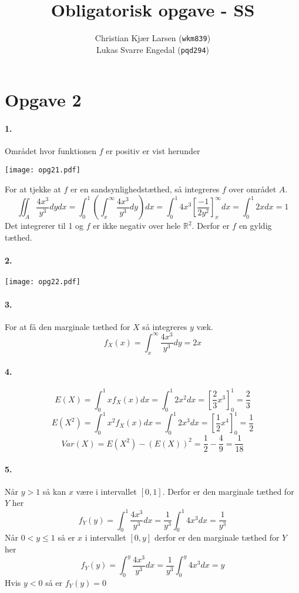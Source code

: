 \documentclass[12pt]{article}
\title{Obligatorisk opgave - SS}
\author{Christian Kjær Larsen (\texttt{wkm839})\\ Lukas Svarre Engedal (\texttt{pqd294})}
\begin{document}
\maketitle

\section*{Opgave 2}

\paragraph{1.}
Området hvor funktionen $f$ er positiv er vist herunder
\begin{center}
  \texttt{[image: opg21.pdf]}
\end{center}
For at tjekke at $f$ er en sandsynlighedstæthed, så integreres $f$ over området $A$.
\[
    \iint_A \frac{4x^3}{y^3} dydx = \int_0^1 \left( \int_x^\infty \frac{4x^3}{y^3} dy \right) dx
    = \int_0^1 4x^3 \left[ \frac{-1}{2y^2} \right]_x^\infty dx
    = \int_0^1 2x dx = 1
\]
Det integrerer til 1 og $f$ er ikke negativ over hele $\mathbb{R}^2$. Derfor er $f$ en gyldig tæthed.
\paragraph{2.}
\begin{center}
  \texttt{[image: opg22.pdf]}
\end{center}
\paragraph{3.}
For at få den marginale tæthed for $X$ så integreres $y$ væk.
\[
    f_X(x)=\int_x^\infty \frac{4x^3}{y^3} dy = 2x
\]
\paragraph{4.}
\[
    E(X) = \int_0^1 xf_X(x)dx = \int_0^1 2x^2 dx = \left[ \frac{2}{3}x^3 \right]_0^1 = \frac{2}{3}
\]
\[
    E(X^2) = \int_0^1 x^2 f_X(x)dx = \int_0^1 2x^3 dx = \left[ \frac{1}{2}x^4 \right]_0^1 = \frac{1}{2}
\]
\[
    Var(X) = E(X^2) - (E(X))^2 = \frac{1}{2} - \frac{4}{9} = \frac{1}{18}
\]
\paragraph{5.}
Når $y > 1$ så kan $x$ være i intervallet $[0,1]$. Derfor er den marginale tæthed for $Y$ her
\[
    f_Y(y) = \int_0^1 \frac{4x^3}{y^3} dx = \frac{1}{y^3} \int_0^1 4x^3 dx = \frac{1}{y^3}
\]
Når $0 < y \leq 1$ så er $x$ i intervallet $[0, y]$ derfor er den marginale tæthed for $Y$ her
\[
    f_Y(y) = \int_0^y \frac{4x^3}{y^3} dx = \frac{1}{y^3} \int_0^y 4x^3 dx = y
\]
Hvis $y < 0$ så er $f_Y(y) = 0$
\end{document}
